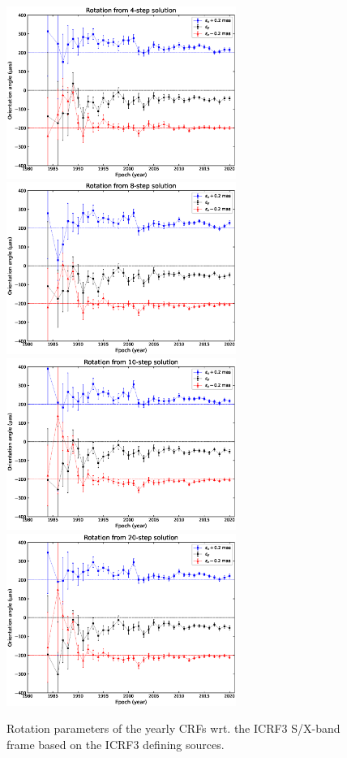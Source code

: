 \documentclass{aa-note}    %
\begin{document}
 \begin{figure}[hbtp]
   \centering
   \includegraphics[width=75mm]{figs/orient-from-yearly-ts-nju} 
   \includegraphics[width=75mm]{figs/orient-from-yearly-ts-nju-8step} \\
   \includegraphics[width=75mm]{figs/orient-from-yearly-ts-nju-10step} 
   \includegraphics[width=75mm]{figs/orient-from-yearly-ts-nju-20step}  
   \caption[]{\label{fig:rotation-plot} %
   Rotation parameters of the yearly CRFs wrt. the ICRF3 S/X-band frame based on the ICRF3 defining sources.
   }
 \end{figure}
\end{document}
